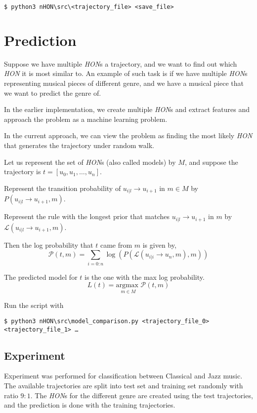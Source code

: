 \documentclass[]{article}
\begin{document}
\texttt{\$ python3 nHON\textbackslash src\textbackslash <trajectory\_file> <save\_file>}


\section{Prediction}
Suppose we have multiple \textit{HON}s a trajectory, and we want to find out which \textit{HON} it is most similar to. An example of such task is if we have multiple \textit{HON}s representing musical pieces of different genre, and we have a musical piece that we want to predict the genre of.

In the earlier implementation, we create multiple \textit{HON}s and extract features and approach the problem as a machine learning problem.

In the current approach, we can view the problem as finding the most likely \textit{HON} that generates the trajectory under random walk.

Let us represent the set of \textit{HON}s (also called models) by $M$, and suppose the trajectory is $t = [u_0,u_1,\ldots,u_n]$. 

Represent the transition probability of $u_{i\vert l} \rightarrow u_{i+1}$ in $m \in M$ by $P\left(u_{i\vert l} \rightarrow u_{i+1}, m\right)$.

Represent the rule with the longest prior that matches $u_{i\vert l} \rightarrow u_{i+1}$ in $m$ by $\mathcal{L}\left(u_{i\vert l} \rightarrow u_{i+1}, m\right)$.

Then the log probability that $t$ came from $m$ is given by,
\[
\mathcal{P}\left(t,m\right) = \sum_{i = 0:n} \log\left(P\left(\mathcal{L}\left(u_{i\vert i} \rightarrow u_{n},m\right),m\right)\right)
\]

The predicted model for $t$ is the one with the max log probability.
\[
L\left(t\right) = \underset{m \in M}{\text{argmax }} \mathcal{P}\left(t,m\right)
\]

Run the script with

\texttt{\$ python3 nHON\textbackslash src\textbackslash model\_comparison.py <trajectory\_file\_0> <trajectory\_file\_1> \ldots}


\subsection{Experiment}
Experiment was performed for classification between Classical and Jazz music. The available trajectories are split into test set and training set randomly with ratio $9:1$. The \textit{HON}s for the different genre are created using the test trajectories, and the prediction is done with the training trajectories.
\end{document}
